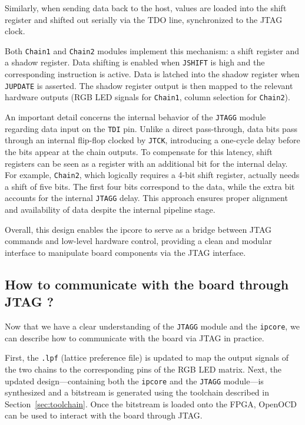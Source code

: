 \documentclass[a4paper,11pt,oneside]{report}
\begin{document}
Similarly, when sending data back to the host, values are loaded into the shift register and shifted out serially via the TDO line, synchronized to the JTAG clock.

Both \texttt{Chain1} and \texttt{Chain2} modules implement this mechanism: a shift register and a shadow register.  
Data shifting is enabled when \texttt{JSHIFT} is high and the corresponding instruction is active.  
Data is latched into the shadow register when \texttt{JUPDATE} is asserted.  
The shadow register output is then mapped to the relevant hardware outputs (RGB LED signals for \texttt{Chain1}, column selection for \texttt{Chain2}).

An important detail concerns the internal behavior of the \texttt{JTAGG} module regarding data input on the \texttt{TDI} pin.  
Unlike a direct pass-through, data bits pass through an internal flip-flop clocked by \texttt{JTCK}, introducing a one-cycle delay before the bits appear at the chain outputs.  
To compensate for this latency, shift registers can be seen as a register with an additional bit for the internal delay.  
For example, \texttt{Chain2}, which logically requires a 4-bit shift register, actually needs a shift of five bits.  
The first four bits correspond to the data, while the extra bit accounts for the internal \texttt{JTAGG} delay.  
This approach ensures proper alignment and availability of data despite the internal pipeline stage.

Overall, this design enables the ipcore to serve as a bridge between JTAG commands and low-level hardware control, providing a clean and modular interface to manipulate board components via the JTAG interface.

\subsection{How to communicate with the board through JTAG ?} 
\label{sec:openocd}
Now that we have a clear understanding of the \texttt{JTAGG} module and the \texttt{ipcore}, we can describe how to communicate with the board via JTAG in practice.

First, the \texttt{.lpf} (lattice preference file) is updated to map the output signals of the two chains to the corresponding pins of the RGB LED matrix.  
Next, the updated design—containing both the \texttt{ipcore} and the \texttt{JTAGG} module—is synthesized and a bitstream is generated using the toolchain described in Section~\ref{sec:toolchain}.  
Once the bitstream is loaded onto the FPGA, OpenOCD can be used to interact with the board through JTAG.
\end{document}
